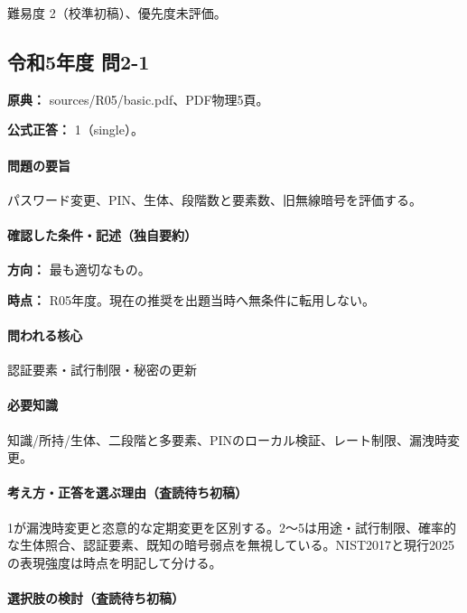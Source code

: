 \par 難易度 2（校準初稿）、優先度未評価。

\subsection{令和5年度 問2-1}
\label{q:r05-reg-basic-2-1}

\noindent\textbf{原典：} sources/R05/basic.pdf、PDF物理5頁。

\textbf{公式正答：} 1（single）。

\paragraph{問題の要旨} パスワード変更、PIN、生体、段階数と要素数、旧無線暗号を評価する。

\paragraph{確認した条件・記述（独自要約）}\mbox{}\par

\noindent\textbf{方向：} 最も適切なもの。\par

\noindent\textbf{時点：} R05年度。現在の推奨を出題当時へ無条件に転用しない。\par

\paragraph{問われる核心} 認証要素・試行制限・秘密の更新

\paragraph{必要知識} 知識/所持/生体、二段階と多要素、PINのローカル検証、レート制限、漏洩時変更。

\paragraph{考え方・正答を選ぶ理由（査読待ち初稿）} 1が漏洩時変更と恣意的な定期変更を区別する。2〜5は用途・試行制限、確率的な生体照合、認証要素、既知の暗号弱点を無視している。NIST2017と現行2025の表現強度は時点を明記して分ける。

\paragraph{選択肢の検討（査読待ち初稿）}\mbox{}\par

